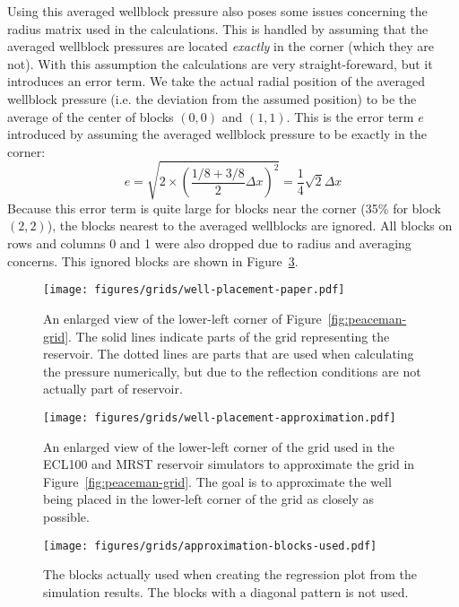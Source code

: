 Using this averaged wellblock pressure also poses some issues concerning the radius matrix used in the calculations. This is handled by assuming that the averaged wellblock pressures are located \emph{exactly} in the corner (which they are not). With this assumption the calculations are very straight-foreward, but it introduces an error term. We take the actual radial position of the averaged wellblock pressure (i.e. the deviation from the assumed position) to be the average of the center of blocks $(0,0)$ and $(1,1)$. This is the error term $e$ introduced by assuming the averaged wellblock pressure to be exactly in the corner:
\begin{equation}
    e = \sqrt{2\times \left( \frac{1/8+3/8}{2}\Delta x \right)^2} = \frac{1}{4}\sqrt{2}\Delta x
\end{equation}
Because this error term is quite large for blocks near the corner (35\% for block $(2,2)$), the  blocks nearest to the averaged wellblocks are ignored. All blocks on rows and columns 0 and 1 were also dropped due to radius and averaging concerns. This ignored blocks are shown in Figure~\ref{fig:blocks-used}.

\begin{figure}[htbp]
    \centering
    \texttt{[image: figures/grids/well-placement-paper.pdf]}
    \caption{An enlarged view of the lower-left corner of Figure~\ref{fig:peaceman-grid}. The solid lines indicate parts of the grid representing the reservoir. The dotted lines are parts that are used when calculating the pressure numerically, but due to the reflection conditions are not actually part of reservoir.}
    \label{fig:well-placement-paper}
\end{figure}

\begin{figure}[htbp]
    \centering
    \texttt{[image: figures/grids/well-placement-approximation.pdf]}
    \caption{An enlarged view of the lower-left corner of the grid used in the ECL100 and MRST reservoir simulators to approximate the grid in Figure~\ref{fig:peaceman-grid}. The goal is to approximate the well being placed in the lower-left corner of the grid as closely as possible.}
    \label{fig:well-placement-approximation}
\end{figure}

\begin{figure}[htbp]
    \centering
    \texttt{[image: figures/grids/approximation-blocks-used.pdf]}
    \caption{The blocks actually used when creating the regression plot from the simulation results. The blocks with a diagonal pattern is not used.}
    \label{fig:blocks-used}
\end{figure}

